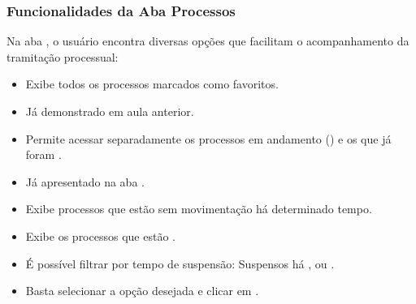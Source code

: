 \documentclass[letterpaper,10pt,brazil]{sphinxmanual}
\begin{document}
\subsubsection{Funcionalidades da Aba Processos}
\label{\detokenize{projud_42_abasuperiorprocesso:funcionalidades-da-aba-processos}}
\sphinxAtStartPar
Na aba , o usuário encontra diversas opções que facilitam o acompanhamento da tramitação processual:
\begin{description}
\begin{itemize}
\item {} 
\sphinxAtStartPar
Exibe todos os processos marcados como favoritos.

\item {} 
\sphinxAtStartPar
Já demonstrado em aula anterior.

\end{itemize}

\begin{itemize}
\item {} 
\sphinxAtStartPar
Permite acessar separadamente os processos em andamento () e os que já foram .

\end{itemize}

\begin{itemize}
\item {} 
\sphinxAtStartPar
Já apresentado na aba .

\item {} 
\sphinxAtStartPar
Exibe processos que estão sem movimentação há determinado tempo.

\end{itemize}

\begin{itemize}
\item {} 
\sphinxAtStartPar
Exibe os processos que estão .

\item {} 
\sphinxAtStartPar
É possível filtrar por tempo de suspensão:
\sphinxhyphen{} Suspensos há ,  ou .

\item {} 
\sphinxAtStartPar
Basta selecionar a opção desejada e clicar em .


\end{itemize}
\end{description}
\end{document}
